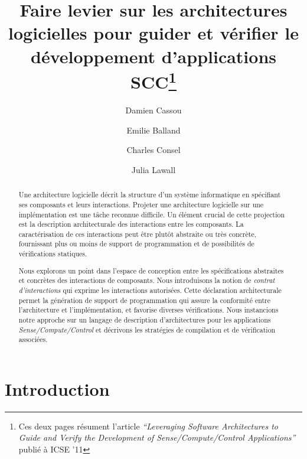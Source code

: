 \documentclass{llncs}
\begin{document}
\title{Faire levier sur les architectures logicielles pour guider et
  vérifier le développement d'applications SCC\thanks{Ces deux pages
    résument l'article \emph{``Leveraging Software Architectures to Guide
    and Verify the Development of Sense/Compute/Control
    Applications''} publié à ICSE ’11}}

\author{Damien Cassou \and Emilie Balland \and Charles
  Consel \and Julia Lawall}

\maketitle              

\begin{abstract}
  Une architecture logicielle décrit la structure d'un système
  informatique en spécifiant ses composants et leurs interactions.
  Projeter une architecture logicielle sur une implémentation est une
  tâche reconnue difficile. Un élément crucial de cette projection est
  la description architecturale des interactions entre les composants.
  La caractérisation de ces interactions peut être plutôt abstraite ou
  très concrète, fournissant plus ou moins de support de programmation
  et de possibilités de vérifications statiques.

  Nous explorons un point dans l'espace de conception entre les
  spécifications abstraites et concrètes des interactions de
  composants. Nous introduisons la notion de \emph{contrat
    d'interactions} qui exprime les interactions autorisées. Cette
  déclaration architecturale permet la génération de support de
  programmation qui assure la conformité entre l'architecture et
l'implémentation, et favorise diverses vérifications. Nous instancions
  notre approche sur un langage de description d'architectures pour
  les applications \emph{Sense/Compute/Control} et décrivons les
  stratégies de compilation et de vérification associées.
\end{abstract}

\section{Introduction}
\end{document}
